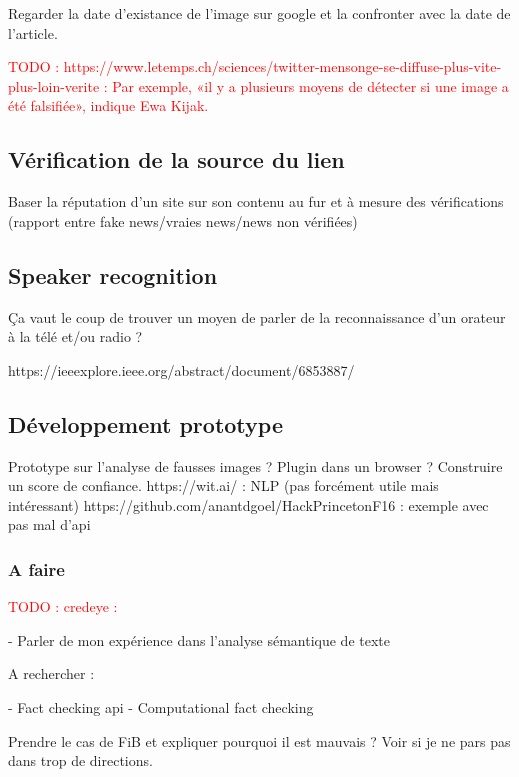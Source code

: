 \documentclass[12pt]{article}
\newcommand\todo[1]{\textcolor{red}{TODO : #1}}
\begin{document}
Regarder la date d'existance de l'image sur google et la confronter avec la date de l'article.

\todo{https://www.letemps.ch/sciences/twitter-mensonge-se-diffuse-plus-vite-plus-loin-verite : Par exemple, «il y a plusieurs moyens de détecter si une image a été falsifiée», indique Ewa Kijak.}


\subsection{Vérification de la source du lien}

Baser la réputation d'un site sur son contenu au fur et à mesure des vérifications (rapport entre fake news/vraies news/news non vérifiées)

\subsection{Speaker recognition}

Ça vaut le coup de trouver un moyen de parler de la reconnaissance d'un orateur à la télé et/ou radio ?

https://ieeexplore.ieee.org/abstract/document/6853887/

\subsection{Développement prototype}

Prototype sur l'analyse de fausses images ? Plugin dans un browser ?
Construire un score de confiance.
https://wit.ai/ : NLP (pas forcément utile mais intéressant)
https://github.com/anantdgoel/HackPrincetonF16 : exemple avec pas mal d'api

\subsubsection{A faire}

\todo{credeye : \cite{popat2018credeye}}

- Parler de mon expérience dans l'analyse sémantique de texte

A rechercher : 

- Fact checking api
- Computational fact checking 

Prendre le cas de FiB et expliquer pourquoi il est mauvais ?
Voir si je ne pars pas dans trop de directions.

\clearpage


\printbibliography[
heading=bibintoc,
title={Bibliographie}
]
\end{document}
